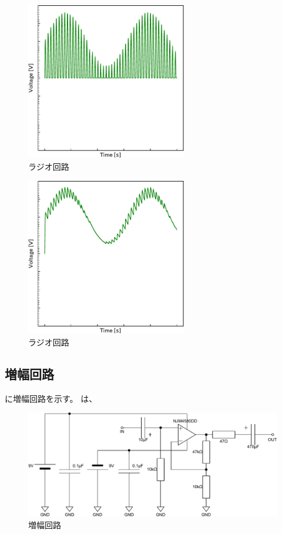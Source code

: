 \documentclass[report.tex]{subfiles}
\begin{document}
\begin{figure}[H]
	\centering
	\includegraphics[width=7cm]{fig/diode.pdf}
	\caption{ラジオ回路}
	\label{fig:diode}
\end{figure}

\begin{figure}[H]
	\centering
	\includegraphics[width=7cm]{fig/capa.pdf}
	\caption{ラジオ回路}
	\label{fig:capa}
\end{figure}

\subsection{増幅回路}

に増幅回路を示す。
は、

\begin{figure}[H]
	\centering
	\includegraphics[width=15cm]{fig/amp.pdf}
	\caption{増幅回路}
	\label{fig:amplifier-circuit}
\end{figure}
\end{document}
